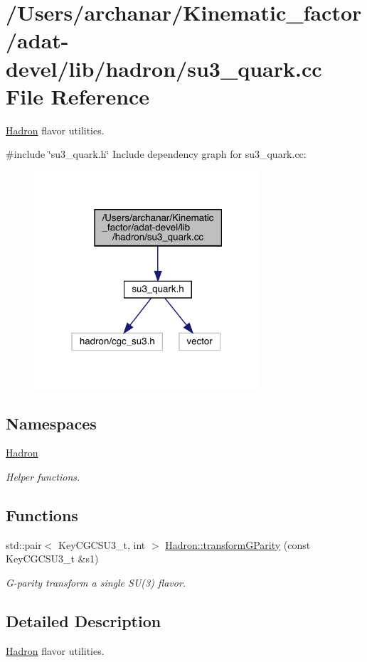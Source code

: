 \hypertarget{adat-devel_2lib_2hadron_2su3__quark_8cc}{}\section{/\+Users/archanar/\+Kinematic\+\_\+factor/adat-\/devel/lib/hadron/su3\+\_\+quark.cc File Reference}
\label{adat-devel_2lib_2hadron_2su3__quark_8cc}


\mbox{\hyperlink{namespaceHadron}{Hadron}} flavor utilities.  


{\ttfamily \#include \char`\"{}su3\+\_\+quark.\+h\char`\"{}}\newline
Include dependency graph for su3\+\_\+quark.\+cc\+:
\nopagebreak
\begin{figure}[H]
\begin{center}
\leavevmode
\includegraphics[width=238pt]{d0/ded/adat-devel_2lib_2hadron_2su3__quark_8cc__incl}
\end{center}
\end{figure}
\subsection*{Namespaces}
\begin{DoxyCompactItemize}
\item 
 \mbox{\hyperlink{namespaceHadron}{Hadron}}
\begin{DoxyCompactList}\small\item\em Helper functions. \end{DoxyCompactList}\end{DoxyCompactItemize}
\subsection*{Functions}
\begin{DoxyCompactItemize}
\item 
std\+::pair$<$ Key\+C\+G\+C\+S\+U3\+\_\+t, int $>$ \mbox{\hyperlink{namespaceHadron_ae0f88dc43657f9dd4f118d41608859cc}{Hadron\+::transform\+G\+Parity}} (const Key\+C\+G\+C\+S\+U3\+\_\+t \&s1)
\begin{DoxyCompactList}\small\item\em G-\/parity transform a single S\+U(3) flavor. \end{DoxyCompactList}\end{DoxyCompactItemize}


\subsection{Detailed Description}
\mbox{\hyperlink{namespaceHadron}{Hadron}} flavor utilities. 

